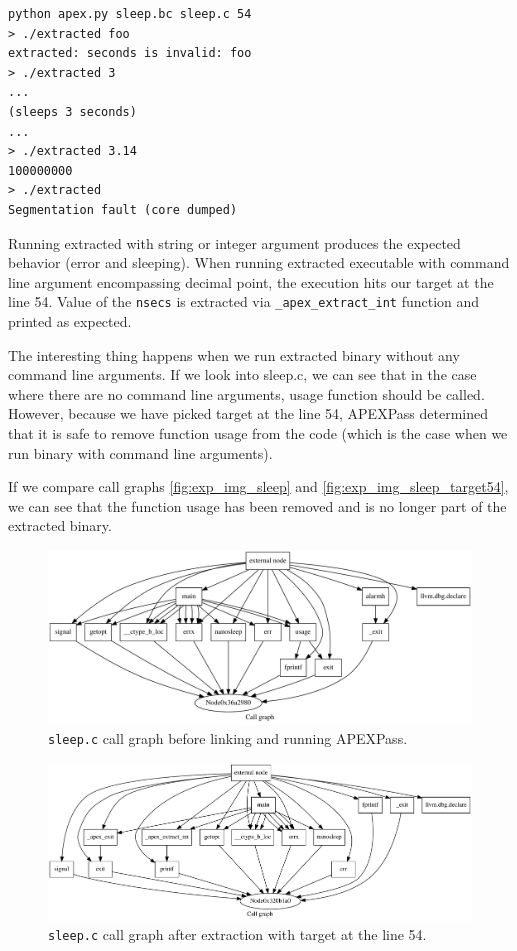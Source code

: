 \documentclass[12pt, twoside]{fithesis2}
\renewcommand{\_}{\leavevmode \kern0.07em\vbox{\hrule width0.4em}}
\begin{document}
\begin{verbatim}
python apex.py sleep.bc sleep.c 54
> ./extracted foo
extracted: seconds is invalid: foo
> ./extracted 3
...
(sleeps 3 seconds)
...
> ./extracted 3.14
100000000
> ./extracted
Segmentation fault (core dumped)
\end{verbatim}

Running extracted with string or integer argument produces the expected
behavior (error and sleeping).
When running extracted executable with command line argument encompassing
decimal point, the execution hits our target at the line 54. Value of the
\texttt{nsecs} is extracted via \texttt{_apex_extract_int}
function and printed as expected.

The interesting thing happens when we run extracted binary without any
command line arguments.
If we look into sleep.c, we can see that in the case where there are no command
line arguments, usage function should be called.
However, because we have picked target at the line 54, APEXPass determined that
it is safe to remove function usage from the code (which is the case when we
run binary with command line arguments).

If we compare call graphs \autoref{fig:exp_img_sleep} and
\autoref{fig:exp_img_sleep_target54}, we can see that the function usage has
been removed and is no longer part of the extracted binary.

\begin{figure}[ht]
    \centering
    \includegraphics[width=1\textwidth]{images/experiments/sleep.pdf}
    \caption{
    \texttt{sleep.c}
    call graph before linking and running APEXPass.
    }
    \label{fig:exp_img_sleep}
\end{figure}

\begin{figure}[ht]
    \centering
    \includegraphics[width=1\textwidth]{images/experiments/sleep_target54.pdf}
    \caption{
    \texttt{sleep.c}
    call graph after extraction with target at the line 54.
    }
    \label{fig:exp_img_sleep_target54}
\end{figure}
\end{document}
